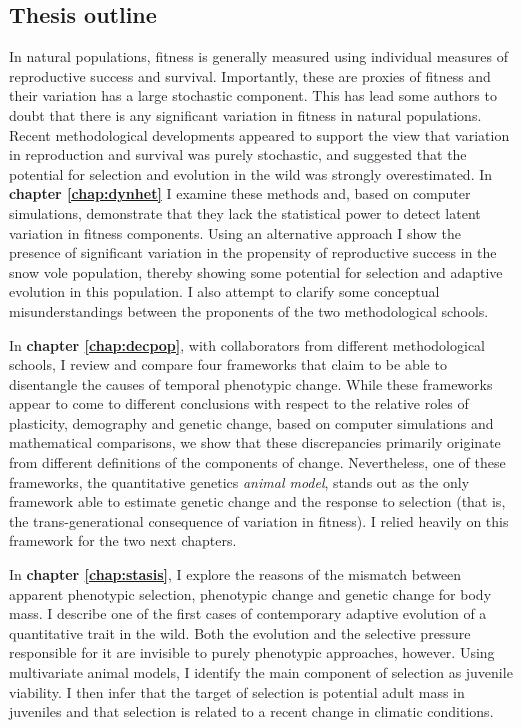 \subsection{Thesis outline}
In natural populations, fitness is generally measured using individual measures of reproductive success and survival. Importantly, these are proxies of fitness and their variation has a large stochastic component. This has lead some authors to doubt that there is any significant variation in fitness in natural populations. Recent methodological developments appeared to support the view that variation in reproduction and survival was purely stochastic, and suggested that the potential for selection and evolution in the wild was strongly overestimated. In \textbf{chapter \ref{chap:dynhet}} I examine these methods and, based on computer simulations, demonstrate that they lack the statistical power to detect latent variation in fitness components. Using an alternative approach I show the presence of significant variation in the propensity of reproductive success in the snow vole population, thereby showing some potential for selection and adaptive evolution in this population. I also attempt to clarify some conceptual misunderstandings between the proponents of the two methodological schools. 

In \textbf{chapter \ref{chap:decpop}}, with collaborators from different methodological schools, I review and compare four frameworks that claim to be able to disentangle the causes of temporal phenotypic change. While these frameworks appear to come to different conclusions with respect to the relative roles of plasticity, demography and genetic change, based on computer simulations and mathematical comparisons, we show that these discrepancies primarily originate from different definitions of the components of change. Nevertheless, one of these frameworks, the quantitative genetics \emph{animal model}, stands out as the only framework able to estimate genetic change and the response to selection (that is, the trans-generational consequence of variation in fitness). I relied heavily on this framework for the two next chapters.  

In \textbf{chapter \ref{chap:stasis}}, I explore the reasons of the mismatch between apparent phenotypic selection, phenotypic change and genetic change for body mass. I describe one of the first cases of contemporary adaptive evolution of a quantitative trait in the wild. Both the evolution and the selective pressure responsible for it are invisible to purely phenotypic approaches, however. Using multivariate animal models, I identify the main component of selection as juvenile viability. I then infer that the target of selection is potential adult mass in juveniles and that selection is related to a recent change in climatic conditions. 

